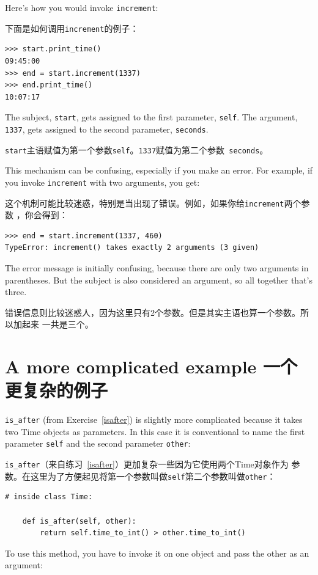 \documentclass[10pt]{book}
\begin{document}
\begin{CJK}{UTF8}{gbsn}
Here's how you would invoke {\tt increment}:

下面是如何调用{\tt increment}的例子：

\begin{verbatim}
>>> start.print_time()
09:45:00
>>> end = start.increment(1337)
>>> end.print_time()
10:07:17
\end{verbatim}
%
The subject, {\tt start}, gets assigned to the first parameter,
{\tt self}.  The argument, {\tt 1337}, gets assigned to the
second parameter, {\tt seconds}.

{\tt start}主语赋值为第一个参数{\tt self}。{\tt 1337}赋值为第二个参数{\tt
seconds}。

This mechanism can be confusing, especially if you make an error.
For example, if you invoke {\tt increment} with two arguments, you
get:

这个机制可能比较迷惑，特别是当出现了错误。例如，如果你给{\tt increment}两个参数
，你会得到：

\begin{verbatim}
>>> end = start.increment(1337, 460)
TypeError: increment() takes exactly 2 arguments (3 given)
\end{verbatim}
%
The error message is initially confusing, because there are
only two arguments in parentheses.  But the subject is also
considered an argument, so all together that's three.

错误信息则比较迷惑人，因为这里只有2个参数。但是其实主语也算一个参数。所以加起来
一共是三个。

\section{A more complicated example 一个更复杂的例子}

\verb"is_after" (from Exercise~\ref{isafter}) is slightly more complicated
because it takes two Time objects as parameters.  In this case it is
conventional to name the first parameter {\tt self} and the second
parameter {\tt other}:

\verb"is_after"（来自练习~\ref{isafter}）更加复杂一些因为它使用两个Time对象作为
参数。在这里为了方便起见将第一个参数叫做{\tt self}第二个参数叫做{\tt other}：

\begin{verbatim}
# inside class Time:

    def is_after(self, other):
        return self.time_to_int() > other.time_to_int()
\end{verbatim}
%
To use this method, you have to invoke it on one object and pass
the other as an argument:


\end{CJK}
\end{document}
